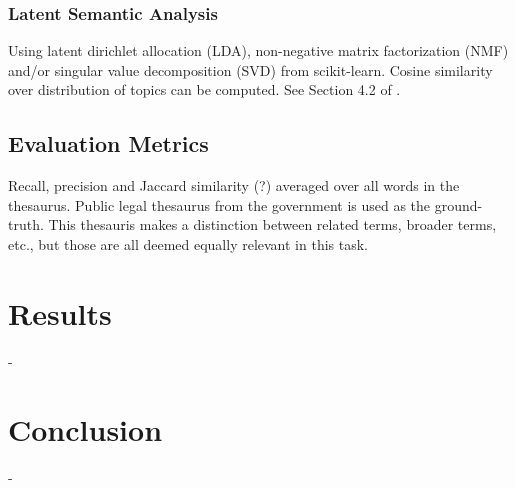 \documentclass{article}
\begin{document}
\begin{multicols}{2}
\subsubsection{Latent Semantic Analysis}
Using latent dirichlet allocation (LDA)\cite{blei2003latent}, non-negative matrix factorization (NMF) and/or singular value decomposition (SVD) from scikit-learn\cite{scikit-learn}. Cosine similarity over distribution of topics can be computed. See Section 4.2 of \cite{stevens2012exploring}.
\subsection{Evaluation Metrics}
Recall, precision and Jaccard similarity (?) averaged over all words in the thesaurus. Public legal thesaurus from the government is used as the ground-truth. This thesauris makes a distinction between related terms, broader terms, etc., but those are all deemed equally relevant in this task.
\section{Results}
-
\section{Conclusion}
-


\end{multicols}
\end{document}
